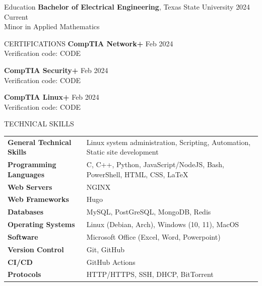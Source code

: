 \documentclass{resume} %
\begin{document}

\begin{rSection}{Education}
{\bf Bachelor of Electrical Engineering}, Texas State University \hfill {2024 Current}\\
Minor in Applied Mathematics \smallskip
\end{rSection}

\begin{rSection}{CERTIFICATIONS}
{\bf CompTIA Network+} \hfill {Feb 2024} \\
Verification code: CODE

{\bf CompTIA Security+} \hfill {Feb 2024} \\
Verification code: CODE

{\bf CompTIA Linux+} \hfill {Feb 2024} \\
Verification code: CODE
\end{rSection}

\begin{rSection}{TECHNICAL SKILLS}
\begin{tabular}{ @{} >{\bfseries}l @{\hspace{6ex}} l }
    General Technical Skills & Linux system administration, Scripting, Automation, Static site development \\
    Programming Languages & C, C++, Python, JavaScript/NodeJS, Bash, PowerShell, HTML, CSS, LaTeX \\
    Web Servers & NGINX \\ 
    Web Frameworks & Hugo \\
    Databases & MySQL, PostGreSQL, MongoDB, Redis \\
    Operating Systems & Linux (Debian, Arch), Windows (10, 11), MacOS \\
    Software & Microsoft Office (Excel, Word, Powerpoint) \\ 
    Version Control & Git, GitHub \\
    CI/CD & GitHub Actions \\
    Protocols & HTTP/HTTPS, SSH, DHCP, BitTorrent \\
\end{tabular}
\end{rSection}
\end{document}
